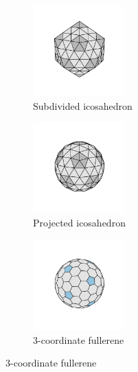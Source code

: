 \begin{figure}[bt]
     \centering
     
      \begin{subfigure}[b]{0.3\textwidth}
         \centering
         \includegraphics[height=3.5cm]{./figures/general_networks/full92_iso.pdf}
         \caption{Subdivided icosahedron}
         \label{fig:topo1}
     \end{subfigure}
     \hfill
     \begin{subfigure}[b]{0.3\textwidth}
         \centering
         \includegraphics[height=3.5cm]{./figures/general_networks/full92_iso_min.pdf}
         \caption{Projected icosahedron}
         \label{fig:topo2}
     \end{subfigure}
     \hfill
     \begin{subfigure}[b]{0.3\textwidth}
         \centering
         \includegraphics[height=3.5cm]{./figures/general_networks/full92.pdf}
         \caption{3\--coordinate fullerene}
         \label{fig:topo3}
     \end{subfigure}
     \hfill
     

\end{figure}
